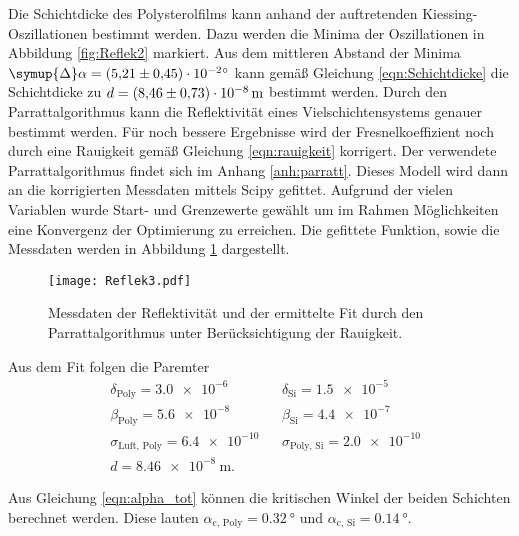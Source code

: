 Die Schichtdicke des Polysterolfilms kann anhand der auftretenden Kiessing-Oszillationen bestimmt werden. Dazu werden die Minima der Oszillationen in Abbildung \ref{fig:Reflek2}
markiert. Aus dem mittleren Abstand der Minima $\symup{\Delta}\alpha = \qty{5.21 +- 0.45e-2}{\degree}$ kann gemäß Gleichung \ref{eqn:Schichtdicke} die Schichtdicke zu 
$d = \qty{8.46 +- 0.73e-8}{\metre}$ bestimmt werden.
Durch den Parrattalgorithmus kann die Reflektivität eines Vielschichtensystems genauer bestimmt werden. Für noch bessere Ergebnisse wird der Fresnelkoeffizient noch durch eine 
Rauigkeit gemäß Gleichung \ref{eqn:rauigkeit} korrigert. Der verwendete Parrattalgorithmus findet sich im Anhang \ref{anh:parratt}. Dieses Modell wird dann an die korrigierten
Messdaten mittels Scipy \cite{scipy} gefittet. Aufgrund der vielen Variablen wurde Start- und Grenzewerte gewählt um im Rahmen Möglichkeiten eine Konvergenz der Optimierung 
zu erreichen. Die gefittete Funktion, sowie die Messdaten werden in Abbildung \ref{fig:Reflek3} dargestellt.
\begin{figure}
    \centering
    \texttt{[image: Reflek3.pdf]}
    \caption{Messdaten der Reflektivität und der ermittelte Fit durch den Parrattalgorithmus unter Berücksichtigung der Rauigkeit.}
    \label{fig:Reflek3}
\end{figure}
Aus dem Fit folgen die Paremter 
\begin{align*}
    &\delta_\text{Poly} = \num{3.0e-6} & &\delta_\text{Si} = \num{1.5e-5} \\
    &\beta_\text{Poly} = \num{5.6e-8} & &\beta_\text{Si} = \num{4.4e-7} \\
    &\sigma_\text{Luft, Poly} = \num{6.4e-10} & &\sigma_\text{Poly, Si} = \num{2.0e-10} \\
    &d = \qty{8.46e-8}{\metre}.
  \end{align*}

Aus Gleichung \ref{eqn:alpha_tot} können die kritischen Winkel der beiden Schichten berechnet werden. Diese lauten $\alpha_\text{c, Poly} = \qty{0.32}{\degree}$ und $\alpha_\text{c, Si} = \qty{0.14}{\degree}$.